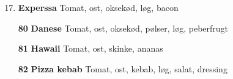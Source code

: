 \documentclass[danish,a4paper]{article}
\begin{document}
\begin{multicols}{2}
\begin{enumerate}[label={\large\textbf{\arabic*}.}]
    \setcounter{enumi}{16}
    \item \textbf{Experssa} Tomat, ost, oksekød, løg, bacon
    \item[\large\textbf{80}] \textbf{Danese} Tomat, ost, oksekød, pølser, løg, peberfrugt 
    \item[\large\textbf{81}] \textbf{Hawaii} Tomat, ost, skinke, ananas 
    \item[\large\textbf{82}] \textbf{Pizza kebab} Tomat, ost, kebab, løg, salat, dressing
\end{enumerate}

\end{multicols}
\end{document}
